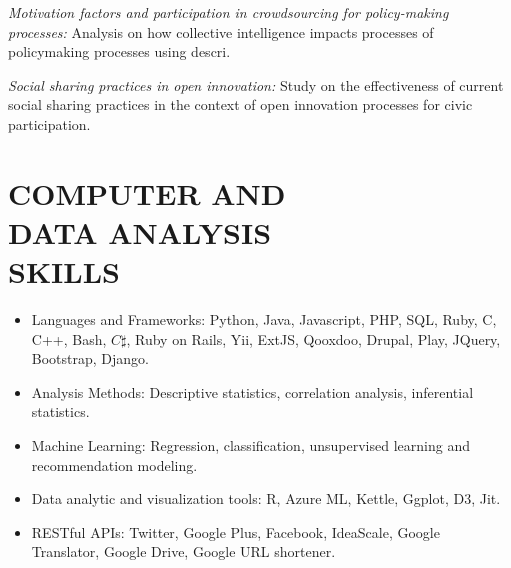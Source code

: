\documentclass[line,margin]{res}
\begin{document}
\begin{resume}
	{\sl Motivation factors and participation in crowdsourcing for policy-making processes:} Analysis on how collective intelligence impacts processes of policymaking processes using descri.
	
	{\sl Social sharing practices in open innovation:} Study on the effectiveness of current social sharing practices in the context of open innovation processes for civic participation. 
 
\section{COMPUTER AND \\ DATA ANALYSIS \\ SKILLS} 
\begin{itemize} \itemsep -2pt      
\item Languages and Frameworks: Python, Java, Javascript, PHP, SQL, Ruby, C, C++, Bash, $C\sharp$, Ruby on Rails, Yii, ExtJS, Qooxdoo, Drupal, Play, JQuery, Bootstrap, Django.
\item Analysis Methods: Descriptive statistics, correlation analysis, inferential statistics.
\item Machine Learning: Regression, classification, unsupervised learning and recommendation modeling.
\item Data analytic and visualization tools: R, Azure ML, Kettle, Ggplot, D3, Jit. 
\item RESTful APIs: Twitter, Google Plus, Facebook, IdeaScale, Google Translator, Google Drive, Google URL shortener.
\end{itemize}



\end{resume}
\end{document}
